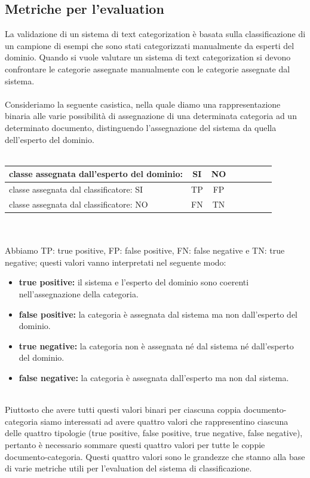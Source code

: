\documentclass{article}
\theoremstyle{plain}
\theoremstyle{definition}
\begin{document}
\subsection{Metriche per l'evaluation}
La validazione di un sistema di text categorization è basata sulla classificazione di un campione di esempi che sono stati categorizzati manualmente da esperti del dominio. Quando si vuole valutare un sistema di text categorization si devono confrontare le categorie assegnate manualmente con le categorie assegnate dal sistema.
\\
\\
Consideriamo la seguente casistica, nella quale diamo una rappresentazione binaria alle varie possibilità di assegnazione di una determinata categoria ad un determinato documento, distinguendo l'assegnazione del sistema da quella dell'esperto del dominio.
\\
\\
\begin{tabular}{l*{6}{c}r}
classe assegnata dall'esperto del dominio:  & SI & NO \\
\hline
classe assegnata dal classificatore: SI & TP & FP \\
classe assegnata dal classificatore: NO & FN & TN \\
\end{tabular}
\\
\\
Abbiamo TP: true positive, FP: false positive, FN: false negative e TN: true negative; questi valori vanno interpretati nel seguente modo:
\begin{itemize}
\item \textbf{true positive:} il sistema e l'esperto del dominio sono coerenti nell'assegnazione della categoria.
\item \textbf{false positive:} la categoria è assegnata dal sistema ma non dall'esperto del dominio.
\item  \textbf{true negative:} la categoria non è assegnata né dal sistema né dall'esperto del dominio.
\item \textbf{false negative:} la categoria è assegnata dall'esperto ma non dal sistema.
\end{itemize}
\phantom
\\
Piuttosto che avere tutti questi valori binari per ciascuna coppia documento-categoria siamo interessati ad avere quattro valori che rappresentino ciascuna delle quattro tipologie (true positive, false positive, true negative, false negative), pertanto è necessario sommare questi quattro valori per tutte le coppie documento-categoria. Questi quattro valori sono le grandezze che stanno alla base di varie metriche utili per l'evaluation del sistema di classificazione.
\end{document}
